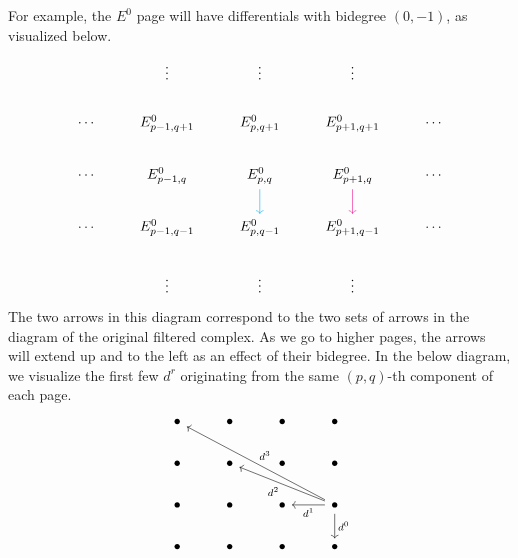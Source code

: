 \documentclass[twoside,10pt]{article}
\begin{document}
For example, the $E^{0}$ page will have differentials with bidegree $(0,-1)$, as visualized below.
\[
\begin{tikzcd}
	&\vdots&\vdots&\vdots\\
	\cdots&E^{0}_{p-1,q+1}&E^{0}_{p,q+1}&E^{0}_{p+1,q+1}&\cdots\\
	\cdots&E^{0}_{p-1,q}&E^{0}_{p,q}\dar[cyan]&E^{0}_{p+1,q}\dar[magenta]&\cdots\\
	\cdots&E^{0}_{p-1,q-1}&E^{0}_{p,q-1}&E^{0}_{p+1,q-1}&\cdots\\
	&\vdots&\vdots&\vdots
\end{tikzcd}
\] 
The two arrows in this diagram correspond to the two sets of arrows in the diagram of the original filtered complex. As we go to higher pages, the arrows will extend up and to the left as an effect of their bidegree. In the below diagram, we visualize the first few $d^{r}$ originating from the same $(p,q)$-th component of each page.
\[
\begin{tikzcd}
	\bullet&\bullet&\bullet&\bullet\\
	\bullet&\bullet&\bullet&\bullet\\
	\bullet&\bullet&\bullet&\bullet\dar{d^{0}}\lar{d^{1}}\arrow[llu,"d^{2}"]\arrow[llluu,"d^{3}"']\\
	\bullet&\bullet&\bullet&\bullet
\end{tikzcd}
\] 
\end{document}
